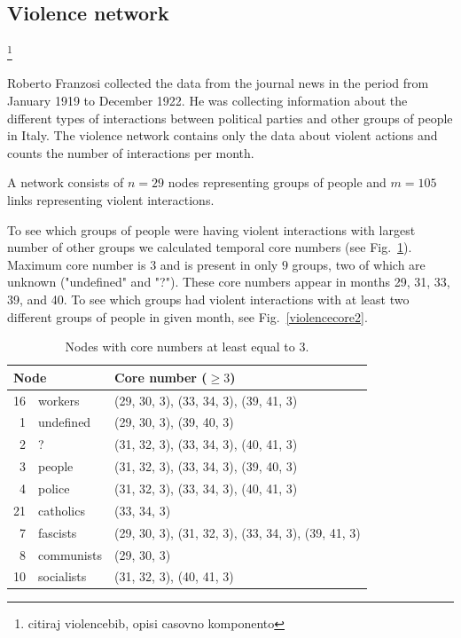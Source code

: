 \documentclass[a4paper,twoside,10pt]{article}
\begin{document}
\subsection{Violence network}\footnote{citiraj violencebib, opisi casovno komponento}

Roberto Franzosi collected the data from the journal news in the period from January 1919 to December 1922. He was collecting information about the different types of interactions between political parties and other groups of people in Italy. The violence network contains only the data about violent actions and counts the number of interactions per month.

A network consists of $n = 29$ nodes representing groups of people and $m = 105$ links representing violent interactions.

To see which groups of people were having violent interactions with largest number of other groups we calculated temporal core numbers (see Fig.~\ref{violencecore3}). Maximum core number is $3$ and is present in only $9$ groups, two of which are unknown ("undefined" and "?"). These core numbers appear in months 29, 31, 33, 39, and 40. To see which groups had violent interactions with at least two different groups of people in given month, see Fig.~\ref{violencecore2}.

\begin{center}
\begin{longtable}{rll}
\caption{Nodes with core numbers at least equal to $3.$}
\label{violencecore3}\\
 \multicolumn{2}{l}{\textbf{Node}} & \textbf{Core number} ($\geq 3$)\\
 \endhead
 16 & workers      &(29, 30, 3), (33, 34, 3), (39, 41, 3)\\
  1 & undefined    &(29, 30, 3), (39, 40, 3)\\
  2 & ?            &(31, 32, 3), (33, 34, 3), (40, 41, 3)\\
  3 & people       &(31, 32, 3), (33, 34, 3), (39, 40, 3)\\
  4 & police       &(31, 32, 3), (33, 34, 3), (40, 41, 3)\\
 21 & catholics    &(33, 34, 3)\\
  7 & fascists     &(29, 30, 3), (31, 32, 3), (33, 34, 3), (39, 41, 3)\\
  8 & communists   &(29, 30, 3)\\
 10 & socialists   &(31, 32, 3), (40, 41, 3)
\end{longtable}
\end{center}
\end{document}
